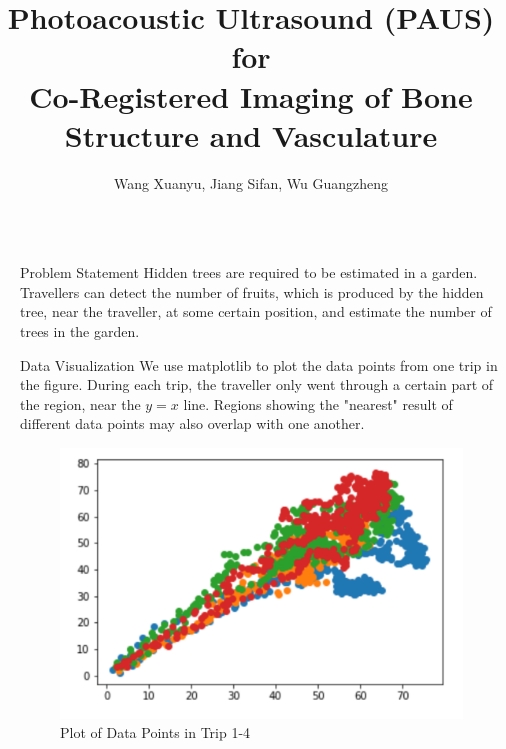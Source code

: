 \documentclass[final]{beamer}
\title{Photoacoustic Ultrasound (PAUS) for \\[.1in] Co-Registered Imaging of Bone \\[.1in] Structure and Vasculature \\[.1in]} %
\author{Wang Xuanyu, Jiang Sifan, Wu Guangzheng} %
\institute{Department and University Name} %
\begin{document}

\setlength{\belowcaptionskip}{2ex} %
\setlength\belowdisplayshortskip{2ex} %

\begin{frame}

\begin{columns}[t]

\begin{column}{\marginwidth}\end{column} %

\begin{column}{\colwidth} %
\begin{tcolorbox}[width=\colwidth,height=\contentheight,top=.2in]
\begin{block}{Problem Statement}
Hidden trees are required to be estimated in a garden. Travellers can detect the number of fruits, which is produced by the hidden tree, near the traveller, at some certain position, and estimate the number of trees in the garden. 

\end{block}

\vspace{.5in}

\begin{block}{Data Visualization}
We use matplotlib to plot the data points from one trip in the figure. During each trip, the traveller only went through a certain part of the region, near the $y=x$ line. Regions showing the "nearest" result of different data points may also overlap with one another.

\vspace{.2in}

\begin{figure}[H]
\includegraphics[width=1.0\textwidth]{data_points}
\caption{Plot of Data Points in Trip 1-4}
\end{figure}


\end{block}
\end{tcolorbox}
\end{column}
\end{columns}
\end{frame}
\end{document}
